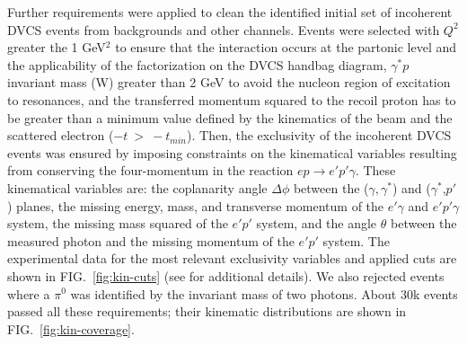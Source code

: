 \documentclass[twocolumn,nofootinbib,showpacs,prl,superscriptaddress,secnumarabic,amssymb,nobibnotes,aps,floatfix]{revtex4}
\begin{document}
Further requirements were applied to clean the identified initial set of 
incoherent DVCS events from backgrounds and other channels. Events were 
selected with $Q^{2}$ greater the 1 GeV$^2$ to ensure that the interaction 
occurs at the partonic level and the applicability of the factorization on the 
DVCS handbag diagram, $\gamma^{*}p$ invariant mass (W) greater than 2 GeV to 
avoid the nucleon region of excitation to resonances, and the transferred 
momentum squared to the recoil proton has to be greater than a
minimum value defined by the kinematics of the beam and the scattered electron 
($-t~>~-t_{min}$). Then, the exclusivity of the incoherent DVCS events was 
ensured by imposing constraints on the kinematical variables resulting from 
conserving the four-momentum in the reaction $ep\rightarrow e'p'\gamma$. These 
kinematical variables are: the coplanarity angle $\Delta\phi$ between the 
($\gamma,\gamma^*$) and ($\gamma^*$,$p'$) planes, the missing energy, mass, and 
transverse momentum of the $e'\gamma$ and $e'p'\gamma$ system, the missing mass 
squared of the $e'p'$ system, and the angle $\theta$ between the measured 
photon and the missing momentum of the $e'p'$ system. The experimental data for 
the most relevant exclusivity variables and applied cuts are shown in 
FIG.~\ref{fig:kin-cuts} (see \cite{Hattawy:thesis} for additional details). We 
also rejected events where a $\pi^0$ was identified by the invariant mass of 
two photons. About 30k events passed all these requirements; their kinematic 
distributions are shown in FIG.~\ref{fig:kin-coverage}.  
\end{document}
